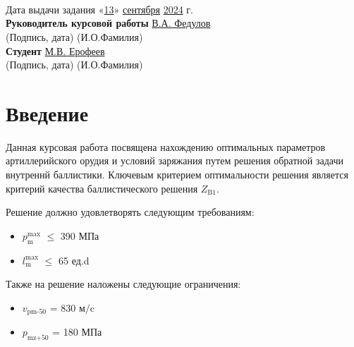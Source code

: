 \documentclass[14pt, a4paper]{report} %
\newcommand{\und}[1]{\uline{#1}}
\begin{document}
\begin{titlepage}
\begin{flushleft}
        \underline{\hspace{15cm}} \\
        \underline{\hspace{15cm}} \\
        \underline{\hspace{15cm}} \\[1.5cm]
        Дата выдачи задания «\und{13}» \und{сентября} \und{2024} г. \\[2cm]
        \textbf{Руководитель курсовой работы} \hfill \underline{\hspace{5cm}} \hfill \und{В.А. Федулов} \\
        \hspace{8cm} (Подпись, дата) \hspace{2cm} (И.О.Фамилия) \\[1.5cm]
        \textbf{Студент} \hfill \underline{\hspace{5cm}} \hfill \und{М.В. Ерофеев} \\
        \hspace{8cm} (Подпись, дата) \hspace{2cm} (И.О.Фамилия)
    \end{flushleft}

\end{titlepage}


\tableofcontents

\newpage
\section*{Введение}
Данная курсовая работа посвящена нахождению оптимальных параметров артиллерийского орудия и условий заряжания путем решения обратной задачи внутреннй баллистики.
Ключевым критерием оптимальности решения является критерий качества баллистического решения $Z_{\text{B1}}$. 

Решение должно удовлетворять следующим требованиям: 
\begin{itemize}
    \item  $p_{\text{m}}^{\text{max}}$ $\leq$ 390 МПа
    \item $l_{\text{m}}^{\text{max}}$ $\leq$ 65 ед.d
\end{itemize}

Также на решение наложены следующие ограничения: 
\begin{itemize}
    \item  $v_{\text{pm-50}}$ = 830 $\text{м/c}$
    \item $p_{\text{mz+50}}$ = 180 МПа
\end{itemize}
\end{document}
